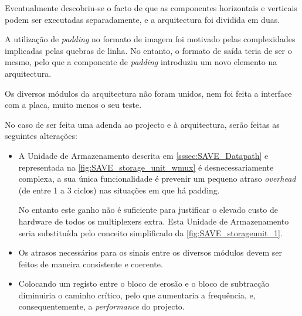 \documentclass[a4paper]{article}
\begin{document}
Eventualmente descobriu-se o facto de que as componentes horizontais e verticais podem ser executadas separadamente, e a arquitectura foi dividida em duas.

A utilização de \textit{padding} no formato de imagem foi motivado pelas complexidades implicadas pelas quebras de linha. No entanto, o formato de saída teria de ser o mesmo, pelo que a componente de \textit{padding} introduziu um novo elemento na arquitectura.

Os diversos módulos da arquitectura não foram unidos, nem foi feita a interface com a placa, muito menos o seu teste.

No caso de ser feita uma adenda ao projecto e à arquitectura, serão feitas as seguintes alterações:

\begin{itemize}
        \item A Unidade de Armazenamento descrita em \ref{sssec:SAVE_Datapath} e representada na \autoref{fig:SAVE_storage_unit_wmux} é desnecessariamente complexa, a sua única funcionalidade é prevenir um pequeno atraso \textit{overhead} (de entre 1 a 3 ciclos) nas situações em que há padding.

No entanto este ganho não é suficiente para justificar o elevado custo de hardware de todos os multiplexers extra. Esta Unidade de Armazenamento seria substituída pelo conceito simplificado da \autoref{fig:SAVE_storageunit_1}.

        \item Os atrasos necessários para os sinais entre os diversos módulos devem ser feitos de maneira consistente e coerente.

        \item Colocando um registo entre o bloco de erosão e o bloco de subtracção diminuiria o caminho crítico, pelo que aumentaria a frequência, e, consequentemente, a \textit{performance} do projecto.

\end{itemize}
\end{document}
